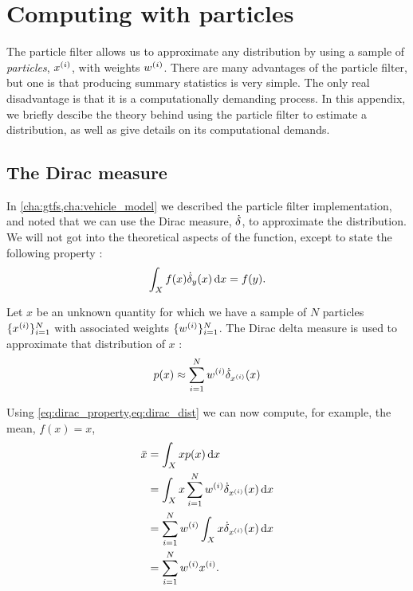 \chapter{Computing with particles}
\label{app:computing-with-particles}

The particle filter allows us to approximate any distribution by using a sample of \emph{particles}, $x^{(i)}$, with weights $w^{(i)}$. There are many advantages of the particle filter, but one is that producing summary statistics is very simple. The only real disadvantage is that it is a computationally demanding process. In this appendix, we briefly descibe the theory behind using the particle filter to estimate a distribution, as well as give details on its computational demands.


\section{The Dirac measure}
\label{app:dirac-delta-measure}

In \cref{cha:gtfs,cha:vehicle_model} we described the particle filter implementation, and noted that we can use the Dirac measure, $\dot\delta$, to approximate the distribution. We will not got into the theoretical aspects of the function, except to state the following property \citep{}:
\begin{equation}
\label{eq:dirac_property}
\int_X f(x) \dot\delta_y(x)\,\mathrm{d}x = f(y).
\end{equation}

Let $x$ be an unknown quantity for which we have a sample of $N$ particles $\{x^{(i)}\}_{i=1}^N$ with associated weights $\{w^{(i)}\}_{i=1}^N$. The Dirac delta measure is used to approximate that distribution of $x$ \citep{}:
\begin{equation}
\label{eq:dirac_dist}
p(x) \approx \sum_{i=1}^N w^{(i)} \dot\delta_{x^{(i)}}(x)
\end{equation}


Using \cref{eq:dirac_property,eq:dirac_dist} we can now compute, for example, the mean, $f(x) = x$,
\begin{equation}
\label{eq:dirac_mean}
\begin{split}
\bar x &= \int_X x p(x) \,\mathrm{d}x \\
&= \int_X x \sum_{i=1}^N w^{(i)} \dot\delta_{x^{(i)}}(x) \,\mathrm{d}x \\
&= \sum_{i=1}^N w^{(i)} \int_X x \dot\delta_{x^{(i)}}(x) \,\mathrm{d}x \\
&= \sum_{i=1}^N w^{(i)} x^{(i)}.
\end{split}
\end{equation}




